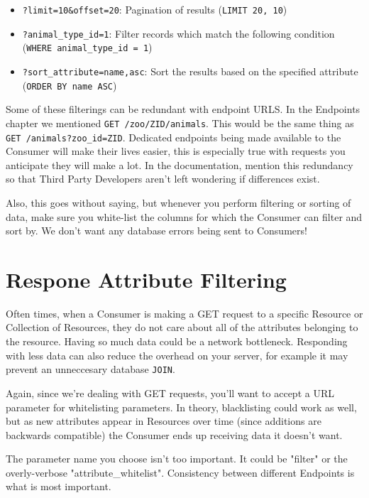 \documentclass{book}
\begin{document}
\begin{itemize}
\item \texttt{?limit=10\&offset=20}: Pagination of results (\texttt{LIMIT 20, 10})
\item \texttt{?animal\_type\_id=1}: Filter records which match the following condition (\texttt{WHERE animal\_type\_id = 1})
\item \texttt{?sort\_attribute=name,asc}: Sort the results based on the specified attribute (\texttt{ORDER BY name ASC})
\end{itemize}

Some of these filterings can be redundant with endpoint URLS. In the Endpoints chapter we mentioned \texttt{GET /zoo/ZID/animals}. This would be the same thing as \texttt{GET /animals?zoo\_id=ZID}. Dedicated endpoints being made available to the Consumer will make their lives easier, this is especially true with requests you anticipate they will make a lot. In the documentation, mention this redundancy so that Third Party Developers aren't left wondering if differences exist.

Also, this goes without saying, but whenever you perform filtering or sorting of data, make sure you white-list the columns for which the Consumer can filter and sort by. We don't want any database errors being sent to Consumers!


\chapter{Respone Attribute Filtering}

Often times, when a Consumer is making a GET request to a specific Resource or Collection of Resources, they do not care about all of the attributes belonging to the resource. Having so much data could be a network bottleneck. Responding with less data can also reduce the overhead on your server, for example it may prevent an unneccesary database \texttt{JOIN}.

Again, since we're dealing with GET requests, you'll want to accept a URL parameter for whitelisting parameters. In theory, blacklisting could work as well, but as new attributes appear in Resources over time (since additions are backwards compatible) the Consumer ends up receiving data it doesn't want.

The parameter name you choose isn't too important. It could be "filter" or the overly-verbose "attribute\_whitelist". Consistency between different Endpoints is what is most important.
\end{document}
